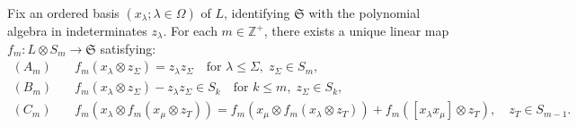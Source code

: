 Fix an ordered basis $(x_\lambda; \lambda \in \Omega)$ of $L$, identifying $\mathfrak{S}$ with the polynomial algebra in indeterminates $z_\lambda$. For each $m \in \mathbb{Z}^+$, there exists a unique linear map $f_m: L \otimes S_m \to \mathfrak{S}$ satisfying:
\begin{align}
(A_m)\quad & f_m(x_\lambda \otimes z_\Sigma) = z_\lambda z_\Sigma \quad \text{for } \lambda \leq \Sigma,\; z_\Sigma \in S_m, \\
(B_m)\quad & f_m(x_\lambda \otimes z_\Sigma) - z_\lambda z_\Sigma \in S_k \quad \text{for } k \leq m,\; z_\Sigma \in S_k, \\
(C_m)\quad & f_m(x_\lambda \otimes f_m(x_\mu \otimes z_T)) = f_m(x_\mu \otimes f_m(x_\lambda \otimes z_T)) + f_m([x_\lambda x_\mu] \otimes z_T), \quad z_T \in S_{m-1}.
\end{align}
